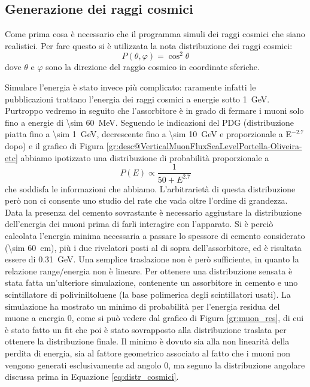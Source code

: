 \subsection{Generazione dei raggi cosmici}
Come prima cosa è necessario che il programma simuli dei raggi cosmici che siano realistici. Per fare questo si è utilizzata la nota distribuzione dei raggi cosmici:
\begin{equation}
	P\left(\theta, \varphi\right) = \cos^2{\theta}
	\label{eq:distr_cosmici}
\end{equation}
dove $\theta$ e $\varphi$ sono la direzione del raggio cosmico in coordinate sferiche.

Simulare l'energia \`e stato invece pi\`u complicato: raramente infatti le pubblicazioni trattano l'energia dei raggi cosmici a energie sotto \SI{1}{\GeV}. 
Purtroppo vedremo in seguito che l'assorbitore \`e in grado di fermare i muoni solo fino a energie di \SI{\sim 60}{\MeV}. 
Seguendo le indicazioni del PDG \cite{bib:Patrignani:2016xqp} (distribuzione piatta fino a \SI{\sim 1}{\GeV}, decrescente fino a \SI{\sim 10}{\GeV} e proporzionale a E$^{-2.7}$ dopo) e il grafico di Figura \ref{gr:desc@VerticalMuonFluxSeaLevelPortella-Oliveira-etc} abbiamo ipotizzato una distribuzione di probabilit\`a proporzionale a 
\begin{equation}
	P\left(E\right) \propto \frac{1}{50+E^{2.7}}
	\label{eq:distr_cosmici_en}
\end{equation}
che soddisfa le informazioni che abbiamo. L'arbitrariet\`a di questa distribuzione per\`o non ci consente uno studio del rate che vada oltre l'ordine di grandezza.
Data la presenza del cemento sovrastante \`e necessario aggiustare la distribuzione dell'energia dei muoni prima di farli interagire con l'apparato. 
Si \`e perci\`o calcolata l'energia minima necessaria a passare lo spessore di cemento considerato (\SI{\sim 60}{\cm}), pi\`u i due rivelatori posti al di sopra dell'assorbitore, ed \`e risultata essere di \SI{0.31}{\GeV}. 
Una semplice traslazione non \`e per\`o sufficiente, in quanto la relazione range/energia non \`e lineare. 
Per ottenere una distribuzione sensata \`e stata fatta un'ulteriore simulazione, contenente un assorbitore in cemento e uno scintillatore di poliviniltoluene (la base polimerica degli scintillatori usati). 
La simulazione ha mostrato un minimo di probabilit\`a per l'energia residua del muone a energia 0, come si pu\`o vedere dal grafico di Figura \ref{gr:muon_res}, di cui \`e stato fatto un fit che poi \`e stato sovrapposto alla distribuzione traslata per ottenere la distribuzione finale.
Il minimo \`e dovuto sia alla non linearit\`a  della perdita di energia, sia al fattore geometrico associato al fatto che i muoni non vengono generati esclusivamente ad angolo 0, ma seguno la distribuzione angolare discussa prima in Equazione \ref{eq:distr_cosmici}.


